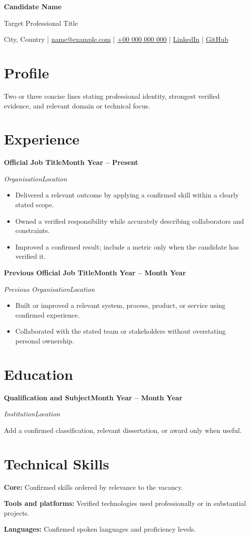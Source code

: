 \documentclass[10pt,a4paper]{article}
\newcommand{\role}[4]{%
  \textbf{#1}\hfill\textbf{#2}\par
  \textit{#3}\hfill\textit{#4}\par\vspace{-2pt}
}
\begin{document}
\color{muted}
\raggedright

\begin{center}
  {\LARGE\bfseries Candidate Name}\par
  \vspace{2pt}
  Target Professional Title\par
  \vspace{3pt}
  City, Country \enspace|\enspace
  \href{mailto:name@example.com}{name@example.com} \enspace|\enspace
  \href{tel:+00000000000}{+00 000 000 000} \enspace|\enspace
  \href{https://www.linkedin.com/}{LinkedIn} \enspace|\enspace
  \href{https://github.com/}{GitHub}
\end{center}

\section{Profile}
Two or three concise lines stating professional identity, strongest verified evidence, and relevant domain or technical focus.

\section{Experience}
\role{Official Job Title}{Month Year -- Present}{Organisation}{Location}
\begin{itemize}
  \item Delivered a relevant outcome by applying a confirmed skill within a clearly stated scope.
  \item Owned a verified responsibility while accurately describing collaborators and constraints.
  \item Improved a confirmed result; include a metric only when the candidate has verified it.
\end{itemize}

\role{Previous Official Job Title}{Month Year -- Month Year}{Previous Organisation}{Location}
\begin{itemize}
  \item Built or improved a relevant system, process, product, or service using confirmed experience.
  \item Collaborated with the stated team or stakeholders without overstating personal ownership.
\end{itemize}

\section{Education}
\role{Qualification and Subject}{Month Year -- Month Year}{Institution}{Location}
Add a confirmed classification, relevant dissertation, or award only when useful.

\section{Technical Skills}
\textbf{Core:} Confirmed skills ordered by relevance to the vacancy.\par
\textbf{Tools and platforms:} Verified technologies used professionally or in substantial projects.\par
\textbf{Languages:} Confirmed spoken languages and proficiency levels.
\end{document}

